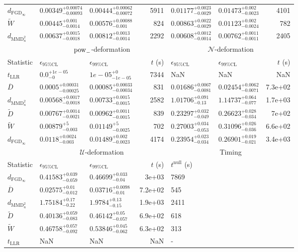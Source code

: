 \begin{tabular}{l|llr|llr}
	$d_{\mathrm{FGD}_{\infty}}$ & $0.00349_{-0.00093}^{+0.00074}$ & $0.00444_{-0.00072}^{+0.00062}$ & 5911 & $0.01177_{-0.0029}^{+0.0023}$ & $0.01473_{-0.0023}^{+0.002}$ & 4101 \\
	$\widetilde{W}$ & $0.00445_{-0.0014}^{+0.001}$ & $0.00576_{-0.001}^{+0.00088}$ & 824 & $0.00863_{-0.0029}^{+0.0022}$ & $0.01123_{-0.0024}^{+0.002}$ & 782 \\
	$d_{\mathrm{MMD}^{2}_{u}}$ & $0.00637_{-0.0018}^{+0.0015}$ & $0.00812_{-0.0014}^{+0.0013}$ & 2292 & $0.00608_{-0.0014}^{+0.0012}$ & $0.00762_{-0.0011}^{+0.0011}$ & 2405 \\
	\toprule
	\multicolumn{1}{c}{} & \multicolumn{3}{c}{$\rm{pow}_{-}$-deformation} & \multicolumn{3}{c}{$\mathcal{N}$-deformation} \\
	Statistic & $\epsilon_{95\%\mathrm{CL}}$ & $\epsilon_{99\%\mathrm{CL}}$ & $t$ (s) & $\epsilon_{95\%\mathrm{CL}}$ & $\epsilon_{99\%\mathrm{CL}}$ & $t$ (s) \\
	\midrule
	$t_{\mathrm{LLR}}$ & $0.0_{-0}^{+1e-05}$ & $1e-05_{-1e-05}^{+0}$ & 7344 & NaN & NaN & NaN \\
	$\overline{D}$ & $0.0005_{-0.00025}^{+0.00031}$ & $0.00085_{-0.00034}^{+0.00033}$ & 831 & $0.01686_{-0.0081}^{+0.0067}$ & $0.02454_{-0.0071}^{+0.0062}$ & 7.3e+02 \\
	$d_{\mathrm{MMD}^{2}_{u}}$ & $0.00568_{-0.0018}^{+0.0017}$ & $0.00733_{-0.0015}^{+0.0015}$ & 2582 & $1.01706_{-0.13}^{+0.091}$ & $1.14737_{-0.077}^{+0.064}$ & 1.7e+03 \\
	$\widetilde{D}$ & $0.00767_{-0.0021}^{+0.0014}$ & $0.00962_{-0.0015}^{+0.0011}$ & 839 & $0.23297_{-0.049}^{+0.032}$ & $0.26623_{-0.034}^{+0.028}$ & 7e+02 \\
	$\widetilde{W}$ & $0.00879_{-0.003}^{+5}$ & $0.01149_{-0.0025}^{+5}$ & 702 & $0.27003_{-0.053}^{+0.034}$ & $0.31096_{-0.036}^{+0.026}$ & 6.6e+02 \\
	$d_{\mathrm{FGD}_{\infty}}$ & $0.0118_{-0.003}^{+0.0024}$ & $0.01489_{-0.0023}^{+0.002}$ & 4174 & $0.23954_{-0.034}^{+0.023}$ & $0.26901_{-0.021}^{+0.019}$ & 3.4e+03 \\
	\toprule
	\multicolumn{1}{c}{} & \multicolumn{3}{c}{$\mathcal{U}$-deformation} & \multicolumn{3}{c}{Timing} \\
	Statistic & $\epsilon_{95\%\mathrm{CL}}$ & $\epsilon_{99\%\mathrm{CL}}$ & $t$ (s) & $t^{\mathrm{null}}$ (s) \\
	\midrule
	$d_{\mathrm{FGD}_{\infty}}$ & $0.41583_{-0.059}^{+0.039}$ & $0.46699_{-0.04}^{+0.033}$ & 3e+03 & 7869 \\
	$\overline{D}$ & $0.02575_{-0.012}^{+0.01}$ & $0.03716_{-0.01}^{+0.0098}$ & 7.2e+02 & 545 \\
	$d_{\mathrm{MMD}^{2}_{u}}$ & $1.75184_{-0.22}^{+0.17}$ & $1.9784_{-0.15}^{+0.13}$ & 1.9e+03 & 2411 \\
	$\widetilde{D}$ & $0.40136_{-0.083}^{+0.059}$ & $0.46142_{-0.057}^{+0.05}$ & 6.9e+02 & 618 \\
	$\widetilde{W}$ & $0.46758_{-0.092}^{+0.057}$ & $0.53846_{-0.062}^{+0.045}$ & 6.3e+02 & 313 \\
	$t_{\mathrm{LLR}}$ & NaN & NaN & NaN & - \\
	\bottomrule
\end{tabular}